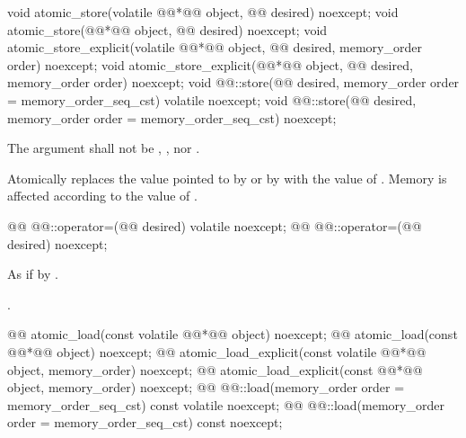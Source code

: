 %
%
%
%
%
\begin{itemdecl}
void atomic_store(volatile @@*@\itcorr[-1]@ object, @@ desired) noexcept;
void atomic_store(@@*@\itcorr[-1]@ object, @@ desired) noexcept;
void atomic_store_explicit(volatile @@*@\itcorr[-1]@ object, @@ desired, memory_order order) noexcept;
void atomic_store_explicit(@@*@\itcorr[-1]@ object, @@ desired, memory_order order) noexcept;
void @@::store(@@ desired, memory_order order = memory_order_seq_cst) volatile noexcept;
void @@::store(@@ desired, memory_order order = memory_order_seq_cst) noexcept;
\end{itemdecl}

\begin{itemdescr}
\pnum
\requires The  argument shall not be ,
, nor .

\pnum
\effects Atomically replaces the value pointed to by  or by 
with the value of . Memory is affected according to the value of
.
\end{itemdescr}

%
%
%
\begin{itemdecl}
@@ @@::operator=(@@ desired) volatile noexcept;
@@ @@::operator=(@@ desired) noexcept;
\end{itemdecl}

\begin{itemdescr}
\pnum
\effects As if by .

\pnum
\returns {}.
\end{itemdescr}

%
%
%
%
%
\begin{itemdecl}
@@ atomic_load(const volatile @@*@\itcorr[-1]@ object) noexcept;
@@ atomic_load(const @@*@\itcorr[-1]@ object) noexcept;
@@ atomic_load_explicit(const volatile @@*@\itcorr[-1]@ object, memory_order) noexcept;
@@ atomic_load_explicit(const @@*@\itcorr[-1]@ object, memory_order) noexcept;
@@ @@::load(memory_order order = memory_order_seq_cst) const volatile noexcept;
@@ @@::load(memory_order order = memory_order_seq_cst) const noexcept;
\end{itemdecl}

